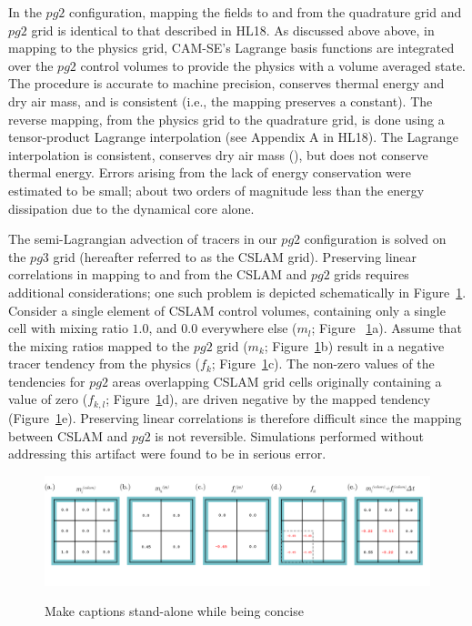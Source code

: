 \documentclass{agujournal}
\begin{document}
In the $pg2$ configuration, mapping the fields to and from the quadrature grid and $pg2$ grid is identical to that described in HL18. As discussed above above, in mapping to the physics grid, CAM-SE's Lagrange basis functions are integrated over the $pg2$ control volumes to provide the physics with a volume averaged state. The procedure is accurate to machine precision, conserves thermal energy and dry air mass, and is consistent (i.e., the mapping preserves a constant). The reverse mapping, from the physics grid to the quadrature grid, is done using a tensor-product Lagrange interpolation (see Appendix A in HL18). The Lagrange interpolation is consistent, conserves dry air mass ({\color{red}{Peter, is this true?}}), but does not conserve thermal energy. Errors arising from the lack of energy conservation were estimated to be small; about two orders of magnitude less than the energy dissipation due to the dynamical core alone.

The semi-Lagrangian advection of tracers in our $pg2$ configuration is solved on the $pg3$ grid (hereafter referred to as the CSLAM grid). Preserving linear correlations in mapping to and from the CSLAM and $pg2$ grids requires additional considerations; one such problem is depicted schematically in Figure~\ref{fig:alg-schematic}. Consider a single element of CSLAM control volumes, containing only a single cell with mixing ratio $1.0$, and $0.0$ everywhere else ($m_l$; Figure ~\ref{fig:alg-schematic}a). Assume that the mixing ratios mapped to the $pg2$ grid ($m_k$; Figure~\ref{fig:alg-schematic}b) result in a negative tracer tendency from the physics ($f_k$; Figure~\ref{fig:alg-schematic}c). The non-zero values of the tendencies for $pg2$ areas overlapping CSLAM grid cells originally containing a value of zero ($f_{k,l}$; Figure~\ref{fig:alg-schematic}d), are driven negative by the mapped tendency (Figure~\ref{fig:alg-schematic}e). Preserving linear correlations is therefore difficult since the mapping between CSLAM and $pg2$ is not reversible. Simulations performed without addressing this artifact were found to be in serious error.

\begin{figure}[t]
\begin{center}
\noindent\includegraphics[width=30pc,angle=0]{figs/alg-schematic.png}\\
\end{center}
\caption{Make captions stand-alone while being concise}
\label{fig:alg-schematic}
\end{figure}
\end{document}
